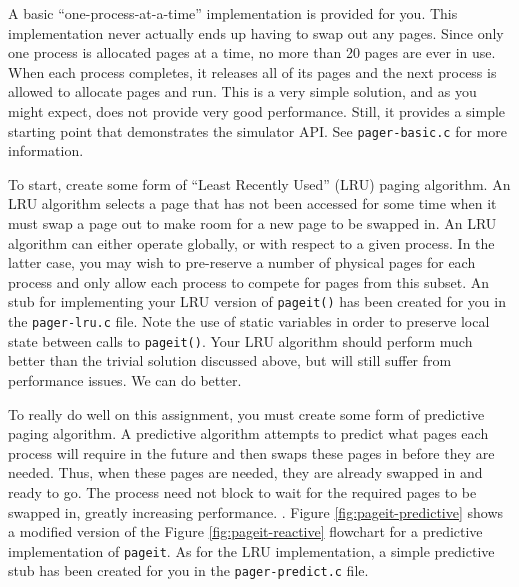 \documentclass[12pt]{article}
\begin{document}
A basic ``one-process-at-a-time'' implementation is provided for
you. This implementation never actually ends up having to swap out any
pages. Since only one process is allocated pages at a time, no more than
20 pages are ever in use. When each process completes, it releases all
of its pages and the next process is allowed to allocate pages and
run. This is a very simple solution, and as you might expect, does not
provide very good performance. Still, it provides a simple starting
point that demonstrates the simulator API. See \texttt{pager-basic.c} for more
information.

To start, create some form of ``Least Recently Used'' (LRU) paging
algorithm. An LRU algorithm selects a page that has not been accessed
for some time when it must swap a page out to make room for a new
page to be swapped in. An LRU algorithm can either operate globally, or
with respect to a given process. In the latter case, you may wish to
pre-reserve a number of physical pages for each process and only allow
each process to compete for pages from this subset. An stub for
implementing your LRU version of \texttt{pageit()} has been created for
you in the \texttt{pager-lru.c} file. Note the use of static variables
in order to preserve local state between calls to \texttt{pageit()}.
Your LRU algorithm
should perform much better than the trivial solution discussed above,
but will still suffer from performance issues. We can do better.

To really do well on this assignment, you must create some form of
predictive paging algorithm. A predictive algorithm attempts to predict
what pages each process will require in the future and then swaps
these pages in before they are needed. Thus, when these pages are needed,
they are already swapped in and ready to go. The process need not
block to wait for the required pages to be swapped in, greatly
increasing performance. . Figure
\ref{fig:pageit-predictive} shows a modified version of the Figure
\ref{fig:pageit-reactive} flowchart for a predictive implementation of
\texttt{pageit}. As for the LRU implementation, a simple predictive stub
has been created for you in the \texttt{pager-predict.c} file.
\end{document}
